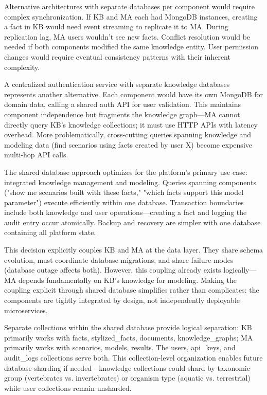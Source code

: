 \documentclass[12pt,a4paper]{article}
\begin{document}
Alternative architectures with separate databases per component would require complex synchronization. If KB and MA each had MongoDB instances, creating a fact in KB would need event streaming to replicate it to MA. During replication lag, MA users wouldn't see new facts. Conflict resolution would be needed if both components modified the same knowledge entity. User permission changes would require eventual consistency patterns with their inherent complexity.

A centralized authentication service with separate knowledge databases represents another alternative. Each component would have its own MongoDB for domain data, calling a shared auth API for user validation. This maintains component independence but fragments the knowledge graph—MA cannot directly query KB's knowledge collections; it must use HTTP APIs with latency overhead. More problematically, cross-cutting queries spanning knowledge and modeling data (find scenarios using facts created by user X) become expensive multi-hop API calls.

The shared database approach optimizes for the platform's primary use case: integrated knowledge management and modeling. Queries spanning components ("show me scenarios built with these facts," "which facts support this model parameter") execute efficiently within one database. Transaction boundaries include both knowledge and user operations—creating a fact and logging the audit entry occur atomically. Backup and recovery are simpler with one database containing all platform state.

This decision explicitly couples KB and MA at the data layer. They share schema evolution, must coordinate database migrations, and share failure modes (database outage affects both). However, this coupling already exists logically—MA depends fundamentally on KB's knowledge for modeling. Making the coupling explicit through shared database simplifies rather than complicates: the components are tightly integrated by design, not independently deployable microservices.

Separate collections within the shared database provide logical separation: KB primarily works with facts, stylized\_facts, documents, knowledge\_graphs; MA primarily works with scenarios, models, results. The users, api\_keys, and audit\_logs collections serve both. This collection-level organization enables future database sharding if needed—knowledge collections could shard by taxonomic group (vertebrates vs. invertebrates) or organism type (aquatic vs. terrestrial) while user collections remain unsharded.
\end{document}
